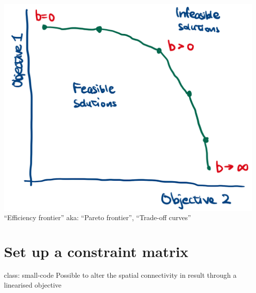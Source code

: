 \documentclass[
]{article}
\begin{document}
\includegraphics{images/tradeoff.png} ``Efficiency frontier'' aka:
``Pareto frontier'', ``Trade-off curves''

\hypertarget{set-up-a-constraint-matrix}{%
\section{Set up a constraint matrix}\label{set-up-a-constraint-matrix}}

class: small-code Possible to alter the spatial connectivity in result
through a linearised objective
\end{document}
